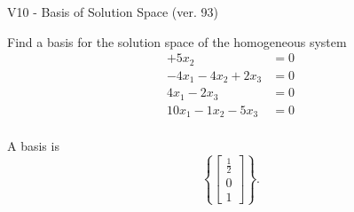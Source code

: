 \begin{exercise}
  \begin{exerciseTitle}V10 - Basis of Solution Space (ver. 93)\end{exerciseTitle}
  \begin{exerciseStatement}
    Find a basis for the solution space of the homogeneous system 
\begin{align*}
 + 5 x_ 2 &= 0  \\ 
  -4 x_ 1 -4 x_ 2 + 2 x_ 3 &= 0  \\ 
  4 x_ 1 -2 x_ 3 &= 0  \\ 
  10 x_ 1 -1 x_ 2 -5 x_ 3 &= 0  \\ 
 \end{align*}


 
  \end{exerciseStatement}

  \begin{exerciseAnswer}
   A basis is   
\[\left\{\left[\begin{array}{c}
\frac{1}{2} \\
0 \\
1
\end{array}\right]\right\}.\]

  


  \end{exerciseAnswer}
\end{exercise}
